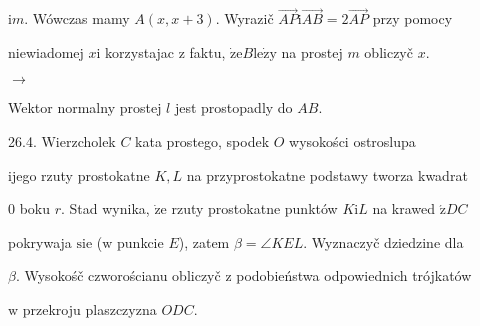 \documentclass[a4paper,12pt]{article}
\begin{document}
$\mathrm{i}m$. Wówczas mamy $A(x,x+3)$. Wyrazič $\vec{AP}\mathrm{i}\vec{AB}=2\vec{AP}$ przy pomocy

niewiadomej $x \mathrm{i}$ korzystajac $\mathrm{z}$ faktu, $\dot{\mathrm{z}}\mathrm{e} B \mathrm{l}\mathrm{e}\dot{\mathrm{z}}\mathrm{y}$ na prostej $m$ obliczyč $x.$

$\rightarrow$

Wektor normalny prostej $l$ jest prostopadly do $AB.$

26.4. Wierzcholek $C$ kata prostego, spodek $O$ wysokości ostroslupa

ijego rzuty prostokatne $K, L$ na przyprostokatne podstawy tworza kwadrat

$0$ boku $r$. Stad wynika, $\dot{\mathrm{z}}\mathrm{e}$ rzuty prostokatne punktów $K\mathrm{i}L$ na krawed $\acute{\mathrm{z}}DC$

pokrywaja $\mathrm{s}\mathrm{i}\mathrm{e}$ ($\mathrm{w}$ punkcie $E$), zatem $\beta=\angle KEL$. Wyznaczyč dziedzine dla

$\beta$. Wysokośč czworościanu obliczyč $\mathrm{z}$ podobieństwa odpowiednich trójkatów

$\mathrm{w}$ przekroju plaszczyzna $ODC.$
\end{document}
